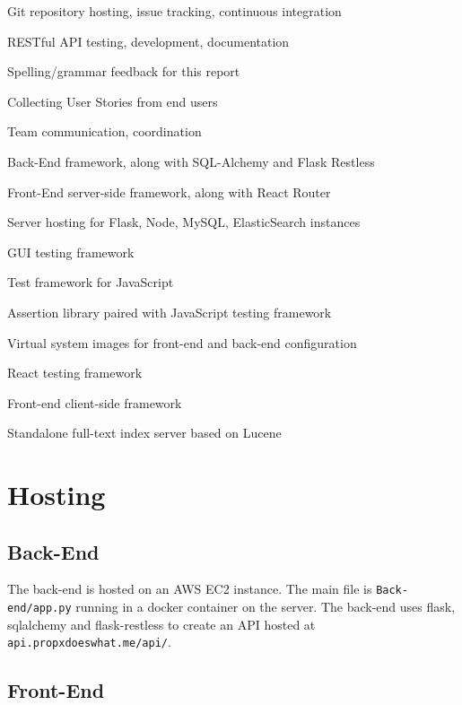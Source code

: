 \documentclass[12pt]{article}
\newcommand{\code}[1]{\texttt{#1}}
\begin{document}
\begin{description}[font=\bfseries,nosep]
	\item[GitLab] Git repository hosting, issue tracking, continuous integration
	\item[Postman] RESTful API testing, development, documentation
	\item[Grammarly] Spelling/grammar feedback for this report
	\item[Piazza] Collecting User Stories from end users
	\item[Slack] Team communication, coordination
	\item[Flask] Back-End framework, along with SQL-Alchemy and Flask Restless
	\item[React] Front-End server-side framework, along with React Router
	\item[AWS] Server hosting for Flask, Node, MySQL, ElasticSearch instances
	\item[Selenium] GUI testing framework
	\item[Mocha] Test framework for JavaScript
	\item[Chai] Assertion library paired with JavaScript testing framework
	\item[Docker] Virtual system images for front-end and back-end configuration
	\item[Enzyme] React testing framework
	\item[Bootstrap] Front-end client-side framework
	\item[ElasticSearch] Standalone full-text index server based on Lucene
\end{description}

\section{Hosting}

\subsection{Back-End}

The back-end is hosted on an AWS EC2 instance. The main file is \code{Back-end/app.py} running in a docker container on the server. The back-end uses flask, sqlalchemy and flask-restless to create an API hosted at \code{api.propxdoeswhat.me/api/}.

\subsection{Front-End}
\end{document}
